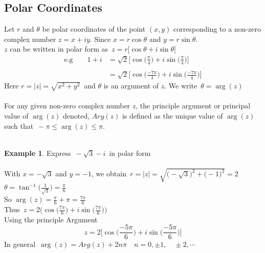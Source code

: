 \documentclass[11pt,a4paper]{article}
\theoremstyle{definition}
\newtheorem{example}[thm]{Example}
\begin{document}
\pagebreak
{\color[wave]{485}\subsection{Polar Coordinates}}
Let $r$ and $\theta$ be polar coordinates of the point $(x,y)$ corresponding to a non-zero complex number $z = x +iy$. Since $x = r\cos \theta$ and $y = r\sin \theta$.\\

$z$ can be written in polar form as $\, z = r\big[\cos \theta + i\sin \theta\big]$\\

\begin{align*}
\text{e.g}\qquad  1 + i & = \sqrt{2}\Big[\cos\Big(\frac{\pi}{4}\Big) + i \sin \Big(\frac{\pi}{4}\Big)\Big]\\\\
& = \sqrt{2}\Big[\cos\Big(\frac{-7 \pi}{4}\Big) + i \sin \Big(\frac{-7 \pi}{4}\Big)\Big]
\end{align*}
Here $r = \left|z\right| = \sqrt{x^2 + y^2}\,$ and $\theta$ is an argument of $z$. We write $\,\theta = \operatorname{arg}(z)$\\\\




For any given non-zero complex number $z$, the principle argument or principal value of $\operatorname{arg}(z)$ denoted, $Arg(z)$ is defined as the unique value of $\operatorname{arg} (z)$ such that $\, - \pi \leq \operatorname{arg}(z) \leq \pi$.\\\\




\begin{example}
Express $\, -\sqrt{3}- i\,$ in polar form\\

\text{\textcolor{red}{Solution}}\\
With $x = -\sqrt{3}$ and $y = -1$, we obtain $\, r = \left|z\right| = \sqrt{\big(-\sqrt{3}\big)^2 + \big(-1\big)^2} = 2$\\

$\theta = \tan^{-1}\Big(\frac{1}{\sqrt{3}}\Big) = \frac{\pi}{6}$\\

So $\operatorname{arg}(z) = \frac{\pi}{6} + \pi = \frac{7\pi}{6}$\\

Thus $\, \displaystyle{z = 2\Big( \cos \Big(\frac{7\pi}{6}\Big) + i \sin \Big(\frac{7\pi}{6}\Big)\Big)}$\\

Using the principle Argument
$$z = 2 \Bigg[\cos \Big(\frac{-5\pi}{6}\Big) + i\sin \Big(\frac{-5\pi}{6}\Big)\Bigg]$$
In general $\, \operatorname{arg}(z) = Arg (z) + 2n\pi\quad  n = 0, \pm 1, \quad  \pm 2, \cdots$
\end{example}
\end{document}
